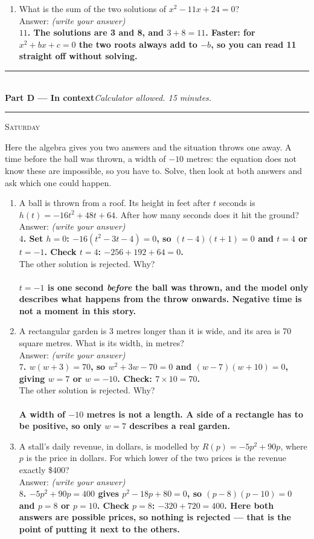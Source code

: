 \documentclass[11pt,a4paper]{article}
\newif\ifANSWERS
\newcommand{\PartHead}[2]{%
  \vspace{6pt}
  {\color{navy}\rule{\textwidth}{0.8pt}}\\[2pt]
  {\large\bfseries\color{navy}#1}\hfill{\small\itshape #2}\\[-4pt]
  {\color{navy}\rule{\textwidth}{0.4pt}}
  \vspace{4pt}
}
\newcommand{\sitting}[1]{{\footnotesize\textsc{\color{navy}#1}}\par\vspace{2pt}}
\newcommand{\spr}{\\[3pt]\hspace*{6pt}Answer: \underline{\hspace{3.2cm}}\hfill{\footnotesize\itshape(write your answer)}}
\newcommand{\ans}[1]{\ {\color{keyred}\bfseries #1}}
\newcommand{\ans}[1]{}
\begin{document}
\begin{enumerate}[leftmargin=20pt,itemsep=9pt]
\item What is the sum of the two solutions of $x^2-11x+24=0$? \spr
  \ans{\\ $11$. The solutions are 3 and 8, and $3+8=11$. Faster: for $x^2+bx+c=0$ the two roots always add to $-b$, so you can read 11 straight off without solving.}
\end{enumerate}

\PartHead{Part D --- In context}{Calculator allowed. 15 minutes.}
\sitting{Saturday}
Here the algebra gives you two answers and the situation throws one away. A time
before the ball was thrown, a width of $-10$ metres: the equation does not know
these are impossible, so you have to. Solve, then look at both answers and ask which
one could happen.

\begin{enumerate}[leftmargin=20pt,itemsep=10pt]
\item A ball is thrown from a roof. Its height in feet after $t$ seconds is
  $h(t)=-16t^2+48t+64$. After how many seconds does it hit the ground? \spr
  \ans{\\ $4$. Set $h=0$: $-16(t^2-3t-4)=0$, so $(t-4)(t+1)=0$ and $t=4$ or $t=-1$. Check $t=4$: $-256+192+64=0$.}\\[2pt]
  The other solution is rejected. Why?\ifANSWERS\else\\
  \underline{\hspace{\linewidth}}\fi
  \ans{\\ $t=-1$ is one second \emph{before} the ball was thrown, and the model only describes what happens from the throw onwards. Negative time is not a moment in this story.}

\item A rectangular garden is 3 metres longer than it is wide, and its area is
  70 square metres. What is its width, in metres? \spr
  \ans{\\ $7$. $w(w+3)=70$, so $w^2+3w-70=0$ and $(w-7)(w+10)=0$, giving $w=7$ or $w=-10$. Check: $7\times10=70$.}\\[2pt]
  The other solution is rejected. Why?\ifANSWERS\else\\
  \underline{\hspace{\linewidth}}\fi
  \ans{\\ A width of $-10$ metres is not a length. A side of a rectangle has to be positive, so only $w=7$ describes a real garden.}

\item A stall's daily revenue, in dollars, is modelled by $R(p)=-5p^2+90p$, where
  $p$ is the price in dollars. For which lower of the two prices is the revenue
  exactly \$400? \spr
  \ans{\\ $8$. $-5p^2+90p=400$ gives $p^2-18p+80=0$, so $(p-8)(p-10)=0$ and $p=8$ or $p=10$. Check $p=8$: $-320+720=400$. Here both answers are possible prices, so nothing is rejected --- that is the point of putting it next to the others.}


\end{enumerate}
\end{document}
